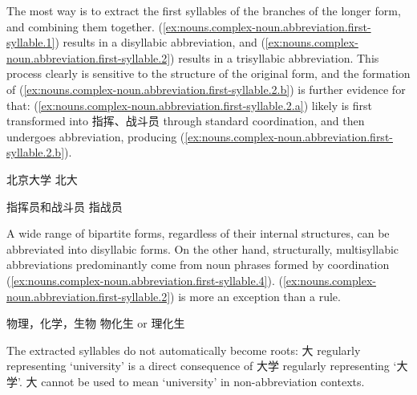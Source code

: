 \documentclass[UTF8, a4paper, oneside, scheme=plain, 12pt]{ctexrep}
\newcommand{\translate}[1]{`#1'}
\begin{document}
The most way is to extract the first syllables of the branches of the longer form,
and combining them together.
(\ref{ex:nouns.complex-noun.abbreviation.first-syllable.1}) results in a disyllabic abbreviation,
and (\ref{ex:nouns.complex-noun.abbreviation.first-syllable.2}) results in a trisyllabic abbreviation.
This process clearly is sensitive to the structure of the original form,
and the formation of (\ref{ex:nouns.complex-noun.abbreviation.first-syllable.2.b})
is further evidence for that:
(\ref{ex:nouns.complex-noun.abbreviation.first-syllable.2.a}) likely is first transformed into
指挥、战斗员 through standard coordination,
and then undergoes abbreviation, producing (\ref{ex:nouns.complex-noun.abbreviation.first-syllable.2.b}).

\begin{exe}
    \ex\label{ex:nouns.complex-noun.abbreviation.first-syllable.1}
    \begin{xlist}
        \ex 北京大学
        \ex 北大
    \end{xlist}
    \ex\label{ex:nouns.complex-noun.abbreviation.first-syllable.2}
    \begin{xlist}
        \ex\label{ex:nouns.complex-noun.abbreviation.first-syllable.2.a} 指挥员和战斗员
        \ex\label{ex:nouns.complex-noun.abbreviation.first-syllable.2.b} 指战员
    \end{xlist}
\end{exe}

A wide range of bipartite forms, regardless of their internal structures,
can be abbreviated into disyllabic forms.
On the other hand, structurally, multisyllabic abbreviations predominantly
come from noun phrases formed by coordination
(\ref{ex:nouns.complex-noun.abbreviation.first-syllable.4}).
(\ref{ex:nouns.complex-noun.abbreviation.first-syllable.2}) is more an exception than a rule.

\begin{exe}
    \ex\label{ex:nouns.complex-noun.abbreviation.first-syllable.4} \begin{xlist}
        \ex 物理，化学，生物
        \ex 物化生 or 理化生
    \end{xlist}
\end{exe}

The extracted syllables do not automatically become roots:
大 regularly representing \translate{university} is a direct consequence of 
大学 regularly representing \translate{大学}.
大 cannot be used to mean \translate{university} in non-abbreviation contexts.
\end{document}
